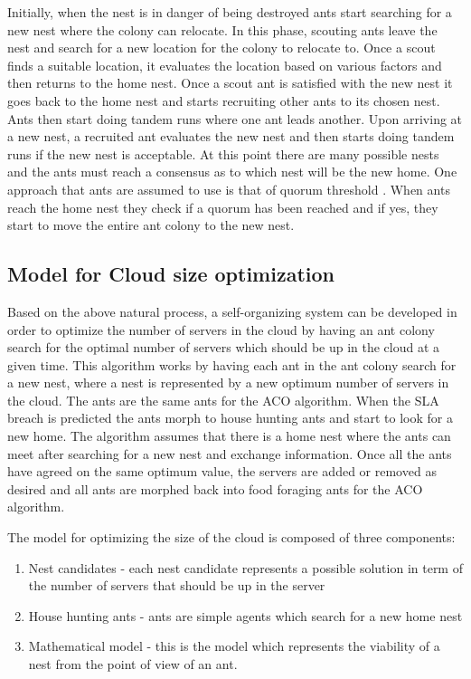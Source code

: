 Initially, when the nest is in danger of being destroyed ants start searching for a new nest where the colony can relocate. In this phase, scouting ants leave the nest and search for a new location for the colony to relocate to. Once a scout finds a suitable location, it evaluates the location based on various factors and then returns to the home nest. Once a scout ant is satisfied with the new nest it goes back to the home nest and starts recruiting other ants to its chosen nest. Ants then start doing tandem runs where one ant leads another. Upon arriving at a new nest, a recruited ant evaluates the new nest and then starts doing tandem runs if the new nest is acceptable. At this point there are many possible nests and the ants must reach a consensus as to which nest will be the new home. One approach that ants are assumed to use is that of quorum threshold \cite{selforg:ant-quorum}. When ants reach the home nest they check if a quorum has been reached and if yes, they start to move the entire ant colony to the new nest.

\subsection{Model for Cloud size optimization}

Based on the above natural process, a self-organizing system can be developed in order to optimize the number of servers in the cloud by having an ant colony search for the optimal number of servers which should be up in the cloud at a given time. This algorithm works by having each ant in the ant colony search for a new nest, where a nest is represented by a new optimum number of servers in the cloud. The ants are the same ants for the ACO algorithm. When the SLA breach is predicted the ants morph to house hunting ants and start to look for a new home. The algorithm assumes that there is a home nest where the ants can meet after searching for a new nest and exchange information. Once all the ants have agreed on the same optimum value, the servers are added or removed as desired and all ants are morphed back into food foraging ants for the ACO algorithm.

The model for optimizing the size of the cloud is composed of three components:

\begin{enumerate}
	\item Nest candidates - each nest candidate represents a possible solution in term of the number of servers that should be up in the server
	\item House hunting ants - ants are simple agents which search for a new home nest
	\item Mathematical model - this is the model which represents the viability of a nest from the point of view of an ant.
\end{enumerate}


